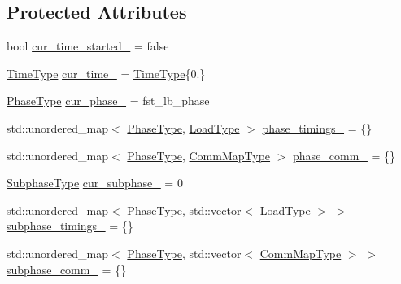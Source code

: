 \subsection*{Protected Attributes}
\begin{DoxyCompactItemize}
\item 
bool \hyperlink{structvt_1_1elm_1_1_element_l_b_data_ae2b4a8fc5193e7aa7bc691ab1a7011ce}{cur\+\_\+time\+\_\+started\+\_\+} = false
\item 
\hyperlink{namespacevt_a2b9f28078dc309ad0706b69ded743e69}{Time\+Type} \hyperlink{structvt_1_1elm_1_1_element_l_b_data_a025fe8411b1c1458109afd4d793e9280}{cur\+\_\+time\+\_\+} = \hyperlink{namespacevt_a2b9f28078dc309ad0706b69ded743e69}{Time\+Type}\{0.\}
\item 
\hyperlink{namespacevt_a46ce6733d5cdbd735d561b7b4029f6d7}{Phase\+Type} \hyperlink{structvt_1_1elm_1_1_element_l_b_data_af82526bf8ad50c6460ba51ffc1c92a43}{cur\+\_\+phase\+\_\+} = fst\+\_\+lb\+\_\+phase
\item 
std\+::unordered\+\_\+map$<$ \hyperlink{namespacevt_a46ce6733d5cdbd735d561b7b4029f6d7}{Phase\+Type}, \hyperlink{namespacevt_a8fb51741340b87d7aaee0bef60e9896b}{Load\+Type} $>$ \hyperlink{structvt_1_1elm_1_1_element_l_b_data_af806cbf36d30d07e340577aeffe06810}{phase\+\_\+timings\+\_\+} = \{\}
\item 
std\+::unordered\+\_\+map$<$ \hyperlink{namespacevt_a46ce6733d5cdbd735d561b7b4029f6d7}{Phase\+Type}, \hyperlink{namespacevt_1_1elm_a38487cb8896b9b4763efa9022fab560e}{Comm\+Map\+Type} $>$ \hyperlink{structvt_1_1elm_1_1_element_l_b_data_a343d66fb777c54e0bdaaddf6f54eda85}{phase\+\_\+comm\+\_\+} = \{\}
\item 
\hyperlink{namespacevt_ae78cbfdf1e57470e33eedb074f2beeba}{Subphase\+Type} \hyperlink{structvt_1_1elm_1_1_element_l_b_data_a0489c5190d8a81bd5a4fba5d80d03d5d}{cur\+\_\+subphase\+\_\+} = 0
\item 
std\+::unordered\+\_\+map$<$ \hyperlink{namespacevt_a46ce6733d5cdbd735d561b7b4029f6d7}{Phase\+Type}, std\+::vector$<$ \hyperlink{namespacevt_a8fb51741340b87d7aaee0bef60e9896b}{Load\+Type} $>$ $>$ \hyperlink{structvt_1_1elm_1_1_element_l_b_data_a4307d2e80d236ad36f8d161febcb239a}{subphase\+\_\+timings\+\_\+} = \{\}
\item 
std\+::unordered\+\_\+map$<$ \hyperlink{namespacevt_a46ce6733d5cdbd735d561b7b4029f6d7}{Phase\+Type}, std\+::vector$<$ \hyperlink{namespacevt_1_1elm_a38487cb8896b9b4763efa9022fab560e}{Comm\+Map\+Type} $>$ $>$ \hyperlink{structvt_1_1elm_1_1_element_l_b_data_a3f4708b0c2d8af6627ee6df925b95890}{subphase\+\_\+comm\+\_\+} = \{\}
\end{DoxyCompactItemize}
